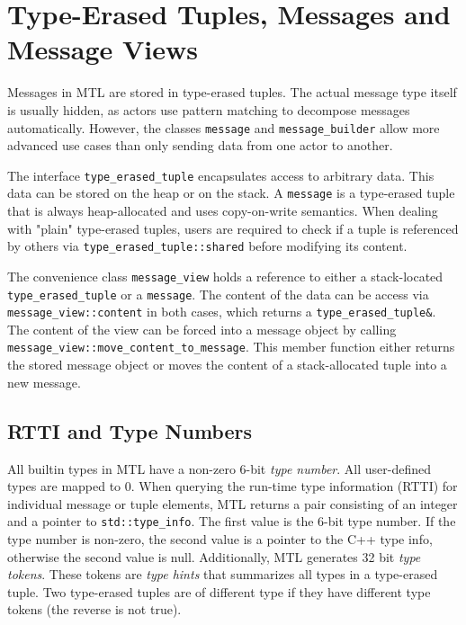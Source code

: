 \section{Type-Erased Tuples, Messages and Message Views}
\label{message}

Messages in MTL are stored in type-erased tuples. The actual message type
itself is usually hidden, as actors use pattern matching to decompose messages
automatically. However, the classes \lstinline^message^ and
\lstinline^message_builder^ allow more advanced use cases than only sending
data from one actor to another.

The interface \lstinline^type_erased_tuple^ encapsulates access to arbitrary
data. This data can be stored on the heap or on the stack. A
\lstinline^message^ is a type-erased tuple that is always heap-allocated and
uses copy-on-write semantics. When dealing with "plain" type-erased tuples,
users are required to check if a tuple is referenced by others via
\lstinline^type_erased_tuple::shared^ before modifying its content.

The convenience class \lstinline^message_view^ holds a reference to either a
stack-located \lstinline^type_erased_tuple^ or a \lstinline^message^. The
content of the data can be access via \lstinline^message_view::content^ in both
cases, which returns a \lstinline^type_erased_tuple&^. The content of the view
can be forced into a message object by calling
\lstinline^message_view::move_content_to_message^. This member function either
returns the stored message object or moves the content of a stack-allocated
tuple into a new message.

\subsection{RTTI and Type Numbers}

All builtin types in MTL have a non-zero 6-bit \emph{type number}. All
user-defined types are mapped to 0. When querying the run-time type information
(RTTI) for individual message or tuple elements, MTL returns a pair consisting
of an integer and a pointer to \lstinline^std::type_info^. The first value is
the 6-bit type number. If the type number is non-zero, the second value is a
pointer to the C++ type info, otherwise the second value is null. Additionally,
MTL generates 32 bit \emph{type tokens}. These tokens are \emph{type hints}
that summarizes all types in a type-erased tuple. Two type-erased tuples are of
different type if they have different type tokens (the reverse is not true).


